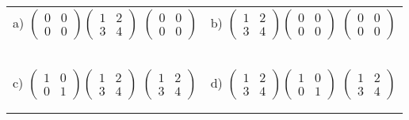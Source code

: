 \documentclass[fontsize=12pt]{scrartcl}
\begin{document}
\begin{tabular}{p{9cm}p{9cm}}
a) $\begin{pmatrix}0&0\\0&0\end{pmatrix}\begin{pmatrix}1&2\\3&4\end{pmatrix}$
 \quad $\begin{pmatrix}0&0\\0&0\end{pmatrix}$
&b) $\begin{pmatrix}1&2\\3&4\end{pmatrix}\begin{pmatrix}0&0\\0&0\end{pmatrix}$
 \quad $\begin{pmatrix}0&0\\0&0\end{pmatrix}$
\\\\\\
\\\\\\

c) $\begin{pmatrix}1&0\\0&1\end{pmatrix}\begin{pmatrix}1&2\\3&4\end{pmatrix}$
 \quad $\begin{pmatrix}1&2\\3&4\end{pmatrix}$
&d) $\begin{pmatrix}1&2\\3&4\end{pmatrix}\begin{pmatrix}1&0\\0&1\end{pmatrix}$
 \quad $\begin{pmatrix}1&2\\3&4\end{pmatrix}$
\\\\\\

\end{tabular}
\end{document}
